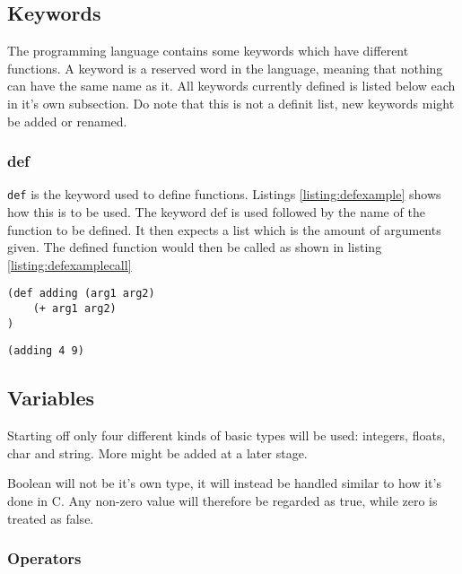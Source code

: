\subsection{Keywords}

The programming language contains some keywords which have different functions.
A keyword is a reserved word in the language, meaning that nothing can have the same name as it. 
All keywords currently defined is listed below each in it's own subsection.
Do note that this is not a definit list, new keywords might be added or renamed.

\subsubsection{def}

\texttt{def} is the keyword used to define functions.
Listings \ref{listing:defexample} shows how this is to be used.
The keyword def is used followed by the name of the function to be defined. 
It then expects a list which is the amount of arguments given.
The defined function would then be called as shown in listing \ref{listing:defexamplecall}

\begin{lstlisting}[caption=Example of how the keyword def is to be used,
	label=listing:defexample]
(def adding (arg1 arg2)
	(+ arg1 arg2)
)
\end{lstlisting}

\begin{lstlisting}[caption=Calling a function named adding with two integers as argument,
	label=listing:defexamplecall]
(adding 4 9)
\end{lstlisting}


\subsection{Variables}

Starting off only four different kinds of basic types will be used: integers, floats, char and string. 
More might be added at a later stage.

Boolean will not be it's own type, it will instead be handled similar to how it's done in C.
Any non-zero value will therefore be regarded as true, while zero is treated as false. 

\subsubsection{Operators}

